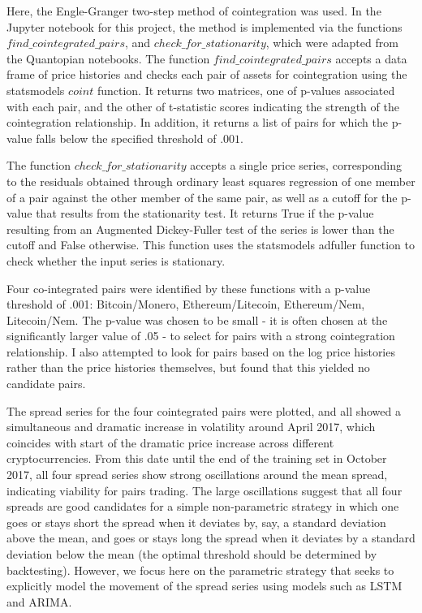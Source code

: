 \documentclass{article}
\begin{document}
Here, the Engle-Granger two-step method of cointegration was used. In the Jupyter notebook for this project, the method is implemented via the functions $find\_cointegrated\_pairs$, and $check\_for\_stationarity$, which were adapted from the Quantopian notebooks. The function $find\_cointegrated\_pairs$ accepts a data frame of price histories and checks each pair of assets for cointegration using the statsmodels $coint$ function. It returns two matrices, one of p-values associated with each pair, and the other of t-statistic scores indicating the strength of the cointegration relationship. In addition, it returns a list of pairs for which the p-value falls below the specified threshold of $.001$.  

The function  $check\_for\_stationarity$ accepts a single price series, corresponding to the residuals obtained through ordinary least squares regression of one member of a pair against the other member of the same pair, as well as a cutoff for the p-value that results from the stationarity test. It returns True if the p-value resulting from an Augmented Dickey-Fuller test of the series is lower than the cutoff and False otherwise. This function uses the statsmodels adfuller function to check whether the input series is stationary. 

Four co-integrated pairs were identified by these functions with a p-value threshold of .001: Bitcoin/Monero, Ethereum/Litecoin, Ethereum/Nem, Litecoin/Nem. The p-value was chosen to be small - it is often chosen at the significantly larger value of .05 - to select for pairs with a strong cointegration relationship. I also attempted to look for pairs based on the log price histories rather than the price histories themselves, but found that this yielded no candidate pairs. 

The spread series for the four cointegrated pairs were plotted, and all showed a simultaneous and dramatic increase in volatility around April 2017, which coincides with start of the dramatic price increase across different cryptocurrencies. From this date until the end of the training set in October 2017, all four spread series show strong oscillations around the mean spread, indicating viability for pairs trading. The large oscillations suggest that all four spreads are good candidates for a simple non-parametric strategy in which one goes or stays short the spread when it deviates by, say, a standard deviation above the mean, and goes or stays long the spread when it deviates by a standard deviation below the mean (the optimal threshold should be determined by backtesting). However, we focus here on the parametric strategy that seeks to explicitly model the movement of the spread series using models such as LSTM and ARIMA. 
\end{document}
